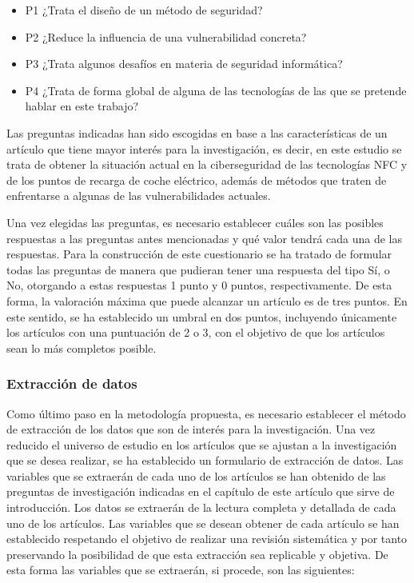 \documentclass[12pt,a4paper,onecolumn,oneside]{report}
\begin{document}
\begin{itemize}
\item P1 ¿Trata el diseño de un método de seguridad?
\item P2 ¿Reduce la influencia de una vulnerabilidad concreta?
\item P3 ¿Trata algunos desafíos en materia de seguridad informática?
\item P4 ¿Trata de forma global de alguna de las tecnologías de las que se pretende hablar en este trabajo?
\end{itemize}

Las preguntas indicadas han sido escogidas en base a las características de un artículo que tiene mayor interés para la investigación, es decir, en este estudio se trata de obtener la situación actual en la ciberseguridad de las tecnologías NFC y de los puntos de recarga de coche eléctrico, además de métodos que traten de enfrentarse a algunas de las vulnerabilidades actuales.

Una vez elegidas las preguntas, es necesario establecer cuáles son las posibles respuestas a las preguntas antes mencionadas y qué valor tendrá cada una de las respuestas. Para la construcción de este cuestionario se ha tratado de formular todas las preguntas de manera que pudieran tener una respuesta del tipo Sí, o No, otorgando a estas respuestas 1 punto y 0 puntos, respectivamente. De esta forma, la valoración máxima que puede alcanzar un artículo es de tres puntos. En este sentido, se ha establecido un umbral en dos puntos, incluyendo únicamente los artículos con una puntuación de 2 o 3, con el objetivo de que los artículos sean lo más completos posible. 


\subsubsection{Extracción de datos}

Como último paso en la metodología propuesta, es necesario establecer el método de extracción de los datos que son de interés para la investigación. Una vez reducido el universo de estudio en los artículos que se ajustan a la investigación que se desea realizar, se ha establecido un formulario de extracción de datos. Las variables que se extraerán de cada uno de los artículos se han obtenido de las preguntas de investigación indicadas en el capítulo de este artículo que sirve de introducción. Los datos se extraerán de la lectura completa y detallada de cada uno de los artículos. Las variables que se desean obtener de cada artículo se han establecido respetando el objetivo de realizar una revisión sistemática y por tanto preservando la posibilidad de que esta extracción sea replicable y objetiva. De esta forma las variables que se extraerán, si procede, son las siguientes:
\end{document}
